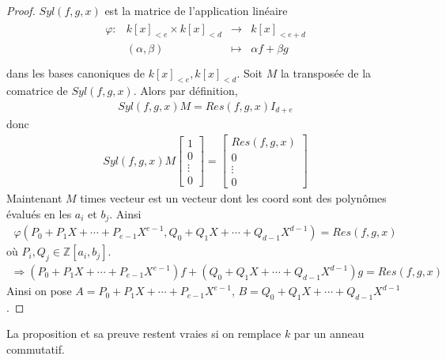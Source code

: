             \begin{proof}
                $Syl(f,g,x)$ est la matrice de l'application linéaire 
                \begin{align*}
                    \begin{array}{cccc}
                        \varphi : & k[x]_{<e} \times k[x]_{<d} & \to & k[x]_{<e + d}\\
                        & (\alpha, \beta) & \mapsto & \alpha f + \beta g \\
                    \end{array}
                \end{align*}
                dans les bases canoniques de $k[x]_{<e}, k[x]_{<d}$. Soit $M$ la transposée de la comatrice de $Syl(f,g,x)$. Alors par définition,
                \begin{align*}
                    Syl(f,g,x) M = Res(f,g,x) I_{d+e}
                \end{align*}
                donc
                \begin{align*}
                    Syl(f,g,x) M \begin{bmatrix} 1 \\ 0 \\ \vdots \\ 0 \end{bmatrix} = \begin{bmatrix} Res(f,g,x) \\ 0 \\ \vdots \\ 0 \end{bmatrix}
                \end{align*}
                Maintenant $M$ times vecteur est un vecteur dont les coord sont des polynômes évalués en les $a_i$ et $b_j$. Ainsi
                \begin{align*}
                    \varphi(P_0 + P_1X + \cdots + P_{e-1}X^{e-1}, Q_0 + Q_1X + \cdots + Q_{d-1}X^{d-1}) = Res(f,g,x)
                \end{align*}
                où $P_i, Q_j \in \mathbb{Z}[a_i, b_j]$. 
                \begin{align*}
                    \Rightarrow (P_0 + P_1X + \cdots + P_{e-1}X^{e-1}) f + (Q_0 + Q_1X + \cdots + Q_{d-1}X^{d-1}) g = Res(f,g,x)
                \end{align*}
                Ainsi on pose $A = P_0 + P_1X + \cdots + P_{e-1}X^{e-1}$, $B = Q_0 + Q_1X + \cdots + Q_{d-1}X^{d-1}$.
            \end{proof}
            \begin{remq}
                La proposition et sa preuve restent vraies si on remplace $k$ par un anneau commutatif.
            \end{remq}
        
